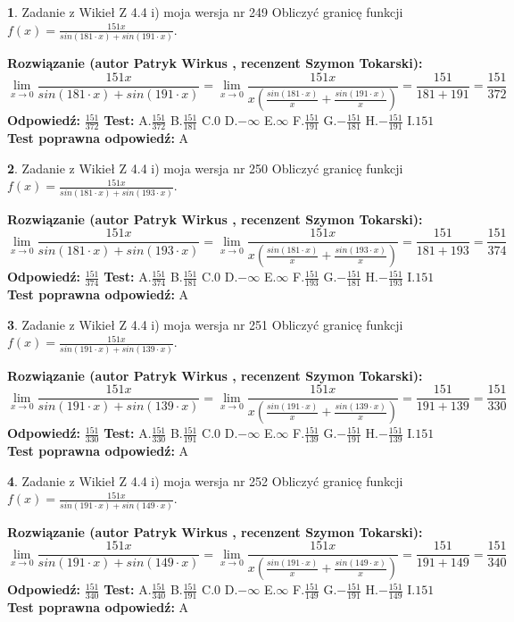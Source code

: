 \documentclass[12pt, a4paper]{article}
\theoremstyle{definition} %
\newtheorem{zad}{}
\newcommand{\zadStart}[1]{\begin{zad}#1\newline}
\newcommand{\zadStop}{\end{zad}}
\newcommand{\rozwStart}[2]{\noindent \textbf{Rozwiązanie (autor #1 , recenzent #2): }\newline}
\newcommand{\rozwStop}{\newline}
\newcommand{\odpStart}{\noindent \textbf{Odpowiedź:}\newline}
\newcommand{\odpStop}{\newline}
\newcommand{\testStart}{\noindent \textbf{Test:}\newline}
\newcommand{\testStop}{\newline}
\newcommand{\kluczStart}{\noindent \textbf{Test poprawna odpowiedź:}\newline}
\newcommand{\kluczStop}{\newline}
\begin{document}
\zadStart{Zadanie z Wikieł Z 4.4 i) moja wersja nr 249}
Obliczyć granicę funkcji $f(x)=\frac{151x}{sin(181\cdot x) +sin(191\cdot x)}$.
\zadStop
\rozwStart{Patryk Wirkus}{Szymon Tokarski}
$$\lim\limits_{x\to 0}\frac{151x}{sin(181\cdot x) +sin(191\cdot x)}=\lim\limits_{x\to 0}\frac{151x}{x(\frac{sin(181\cdot x)}{x}+\frac{sin(191\cdot x)}{x})}=\frac{151}{181+191} = \frac{151}{372}$$
\rozwStop
\odpStart
$\frac{151}{372}$
\odpStop
\testStart
A.$\frac{151}{372}$
B.$\frac{151}{181}$
C.$0$
D.$-\infty$
E.$\infty$
F.$\frac{151}{191}$
G.$-\frac{151}{181}$
H.$-\frac{151}{191}$
I.$151$
\testStop
\kluczStart
A
\kluczStop



\zadStart{Zadanie z Wikieł Z 4.4 i) moja wersja nr 250}
Obliczyć granicę funkcji $f(x)=\frac{151x}{sin(181\cdot x) +sin(193\cdot x)}$.
\zadStop
\rozwStart{Patryk Wirkus}{Szymon Tokarski}
$$\lim\limits_{x\to 0}\frac{151x}{sin(181\cdot x) +sin(193\cdot x)}=\lim\limits_{x\to 0}\frac{151x}{x(\frac{sin(181\cdot x)}{x}+\frac{sin(193\cdot x)}{x})}=\frac{151}{181+193} = \frac{151}{374}$$
\rozwStop
\odpStart
$\frac{151}{374}$
\odpStop
\testStart
A.$\frac{151}{374}$
B.$\frac{151}{181}$
C.$0$
D.$-\infty$
E.$\infty$
F.$\frac{151}{193}$
G.$-\frac{151}{181}$
H.$-\frac{151}{193}$
I.$151$
\testStop
\kluczStart
A
\kluczStop



\zadStart{Zadanie z Wikieł Z 4.4 i) moja wersja nr 251}
Obliczyć granicę funkcji $f(x)=\frac{151x}{sin(191\cdot x) +sin(139\cdot x)}$.
\zadStop
\rozwStart{Patryk Wirkus}{Szymon Tokarski}
$$\lim\limits_{x\to 0}\frac{151x}{sin(191\cdot x) +sin(139\cdot x)}=\lim\limits_{x\to 0}\frac{151x}{x(\frac{sin(191\cdot x)}{x}+\frac{sin(139\cdot x)}{x})}=\frac{151}{191+139} = \frac{151}{330}$$
\rozwStop
\odpStart
$\frac{151}{330}$
\odpStop
\testStart
A.$\frac{151}{330}$
B.$\frac{151}{191}$
C.$0$
D.$-\infty$
E.$\infty$
F.$\frac{151}{139}$
G.$-\frac{151}{191}$
H.$-\frac{151}{139}$
I.$151$
\testStop
\kluczStart
A
\kluczStop



\zadStart{Zadanie z Wikieł Z 4.4 i) moja wersja nr 252}
Obliczyć granicę funkcji $f(x)=\frac{151x}{sin(191\cdot x) +sin(149\cdot x)}$.
\zadStop
\rozwStart{Patryk Wirkus}{Szymon Tokarski}
$$\lim\limits_{x\to 0}\frac{151x}{sin(191\cdot x) +sin(149\cdot x)}=\lim\limits_{x\to 0}\frac{151x}{x(\frac{sin(191\cdot x)}{x}+\frac{sin(149\cdot x)}{x})}=\frac{151}{191+149} = \frac{151}{340}$$
\rozwStop
\odpStart
$\frac{151}{340}$
\odpStop
\testStart
A.$\frac{151}{340}$
B.$\frac{151}{191}$
C.$0$
D.$-\infty$
E.$\infty$
F.$\frac{151}{149}$
G.$-\frac{151}{191}$
H.$-\frac{151}{149}$
I.$151$
\testStop
\kluczStart
A
\kluczStop
\end{document}
